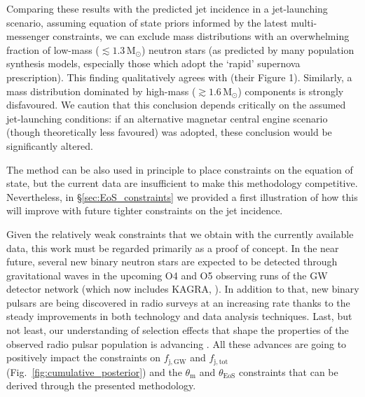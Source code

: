 \documentclass[]{aa}
\newcommand{\resp}[1]{#1}
\begin{document}
Comparing these results with the predicted jet \resp{incidence} in a \citet{Blandford1977} jet-launching scenario, assuming equation of state priors informed by the latest multi-messenger constraints, we can exclude mass distributions with an overwhelming fraction of low-mass ($\lesssim 1.3\,\mathrm{M_\odot}$) neutron stars (as predicted by many population synthesis models, especially those which adopt the \citealt{Fryer2012} `rapid' supernova prescription).  This finding qualitatively agrees with \citealt{Sarin2022} (their Figure 1). Similarly, a mass distribution dominated by high-mass ($\gtrsim 1.6\,\mathrm{M_\odot}$) components is strongly disfavoured. We caution that this conclusion depends critically on the assumed jet-launching conditions: if an alternative magnetar central engine scenario (though theoretically less favoured) was adopted, these conclusion would be significantly altered.

The method can be also used in principle to place constraints on the equation of state, but the current data are insufficient to make this methodology competitive. Nevertheless, \resp{in \S\ref{sec:EoS_constraints}} we \resp{provided a first illustration of how} this will improve with future tighter constraints on the jet \resp{incidence}.

\resp{Given the relatively weak constraints that we obtain with the currently available data, this work must be regarded primarily as a proof of concept.} In the near future, several new binary neutron stars are expected \citep{LVC2020prospects} to be detected through gravitational waves in the upcoming O4 and O5 observing runs of the GW  detector network (which now includes KAGRA, \citealt{Somiya2012}). In addition to that, new binary pulsars are being discovered in radio surveys \citep{Han2021,Pan2021,Good2021,Agazie2021} at an increasing rate thanks to the steady improvements in both technology and data analysis techniques.  Last, but not least, our understanding of selection effects that shape the properties of the observed radio pulsar population is advancing \citep{Chattopadhyay2020}. \resp{All these advances are going to positively impact the constraints on $f_\mathrm{j,GW}$ and $f_\mathrm{j,tot}$ (Fig.~\ref{fig:cumulative_posterior}) and the $\theta_\mathrm{m}$ and $\theta_\mathrm{EoS}$ constraints that can be derived through the presented methodology.}
\end{document}
